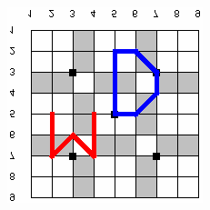 \begin{anexos}
\begin{figure}[H]
\begin{minipage}{0.5\linewidth}
	\end{minipage} %
	\hfill
	\begin{minipage}{0.5\linewidth}  %
		\centering
		\includegraphics[width=\linewidth]{passgo3.png} %
	\end{minipage} %
	\label{go-passwords}
\end{figure} 




\end{anexos}
